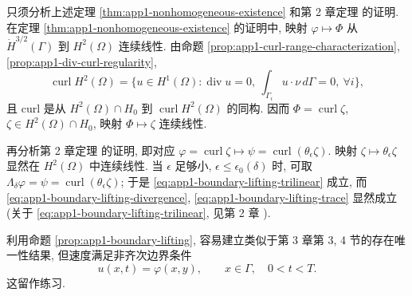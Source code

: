 \begin{Proof}
只须分析上述定理 \ref{thm:app1-nonhomogeneous-existence} 和第 2 章定理  的证明. 在定理 \ref{thm:app1-nonhomogeneous-existence} 的证明中, 映射 $\varphi\mapsto\Phi$ 从 $\dot H^{3/2}(\Gamma)$ 到 $H^2(\Omega)$ 连续线性. 由命题 \ref{prop:app1-curl-range-characterization}, \ref{prop:app1-div-curl-regularity},
\[
\operatorname{curl}H^2(\Omega)
=\{u\in H^1(\Omega):\operatorname{div}u=0,
\ \int_{\Gamma_i}u\cdot\nu\,d\Gamma=0,
\ \forall i\},
\]
且 curl 是从 $H^2(\Omega)\cap H_0$ 到 $\operatorname{curl}H^2(\Omega)$ 的同构. 因而 $\Phi=\operatorname{curl}\zeta$, $\zeta\in H^2(\Omega)\cap H_0$, 映射 $\Phi\mapsto\zeta$ 连续线性.

再分析第 2 章定理  的证明, 即对应 $\varphi=\operatorname{curl}\zeta\mapsto\psi=\operatorname{curl}(\theta_\epsilon\zeta)$. 映射 $\zeta\mapsto\theta_\epsilon\zeta$ 显然在 $H^2(\Omega)$ 中连续线性. 当 $\epsilon$ 足够小, $\epsilon\leq\epsilon_0(\delta)$ 时, 可取 $\Lambda_\delta\varphi=\psi=\operatorname{curl}(\theta_\epsilon\zeta)$; 于是 \eqref{eq:app1-boundary-lifting-trilinear} 成立, 而 \eqref{eq:app1-boundary-lifting-divergence}, \eqref{eq:app1-boundary-lifting-trace} 显然成立(关于 \eqref{eq:app1-boundary-lifting-trilinear}, 见第 2 章 ).
\end{Proof}

\hypertarget{appendix-01-page-335}{}
\begin{Remark}
\label{rem:app1-evolution-nonhomogeneous-boundary}
利用命题 \ref{prop:app1-boundary-lifting}, 容易建立类似于第 3 章第 3, 4 节的存在唯一性结果, 但速度满足非齐次边界条件
\[
u(x,t)=\varphi(x,y),
\qquad x\in\Gamma,\quad 0<t<T.
\]
这留作练习.
\end{Remark}
